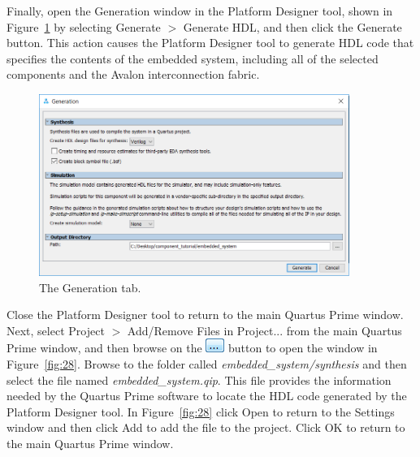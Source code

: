 \documentclass[11pt, twoside, pdftex]{article}
\begin{document}
\clearpage
\newpage
Finally, open the {\sf Generation} window in the Platform Designer tool, shown in Figure~\ref{fig:27} by selecting {\sf Generate $>$ Generate HDL},
and then click the {\sf Generate} button. This action causes the Platform Designer tool to generate HDL
code that specifies the contents of the embedded system, including all of the selected 
components and the Avalon interconnection fabric.

\begin{figure}[H]
   \begin{center}
        \includegraphics[width=0.9\textwidth]{figures/figure27.png}
   \end{center}
   \caption{The Generation tab.}
	\label{fig:27}
\end{figure}

\clearpage
\newpage
Close the Platform Designer tool to return to the main Quartus Prime window.
Next, select {\sf Project $>$ Add/Remove Files in Project...} from the main Quartus Prime window,
and then browse on the \includegraphics[scale=.6]{figures/icon1.png} button to open the window in
Figure~\ref{fig:28}. Browse to the folder called {\it embedded\_system/synthesis} and then select the file
named {\it embedded\_system.qip}. This file provides the information needed by the 
Quartus Prime software to locate the HDL code generated by the Platform Designer tool. In 
Figure~\ref{fig:28} click {\sf Open} to return to the {\sf Settings} window and then click
{\sf Add} to add the file to the project. Click {\sf OK} to return to the main Quartus Prime window.
\end{document}
